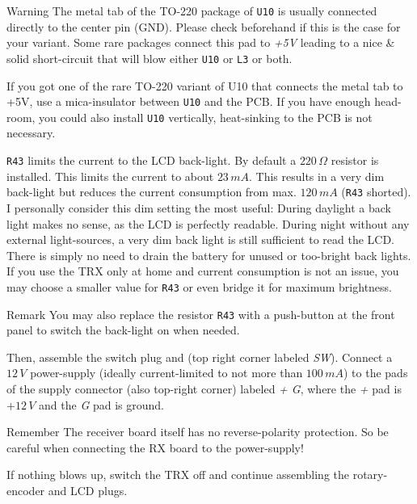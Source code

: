 \documentclass[10pt, a4paper,twoside]{scrartcl}
\newenvironment{remember}{\begin{bclogo}[couleur=blue!30,arrondi=.1,logo=\bccrayon,ombre=true]{Remember}}{\end{bclogo}}
\newenvironment{remark}{\begin{bclogo}[couleur=blue!30,arrondi=.1,logo=\bcinfo,ombre=true]{Remark}}{\end{bclogo}}
\newenvironment{warning}{\begin{bclogo}[couleur=red!30,arrondi=.1,logo=\bcattention,ombre=true]{Warning}}{\end{bclogo}}
\begin{document}
\begin{warning}
The metal tab of the TO-220 package of \texttt{U10} is usually connected directly to the center pin (GND). Please check beforehand if this is the case for your variant. Some rare packages connect this pad to \emph{+5V} leading to a nice \& solid short-circuit that will blow either \texttt{U10} or \texttt{L3} or both.
\end{warning}

If you got one of the rare TO-220 variant of U10 that connects the metal tab to +5V, use a mica-insulator between \texttt{U10} and the PCB. If you have enough head-room, you could also install \texttt{U10} vertically, heat-sinking to the PCB is not necessary.

 \texttt{R43} limits the current to the LCD back-light. By default a $220\,\Omega$ resistor is installed. This limits the current to about $23\,mA$. This results in a very dim back-light but reduces the current consumption from max. $120\, mA$ (\texttt{R43} shorted). I personally consider this dim setting the most useful: During daylight a back light makes no sense, as the LCD is perfectly readable. During night without any external light-sources, a very dim back light is still sufficient to read the LCD. There is simply no need to drain the battery for unused or too-bright back lights. If you use the TRX only at home and current consumption is not an issue, you may choose a smaller value for \texttt{R43} or even bridge it for maximum brightness.
 
\begin{remark} 
 You may also replace the resistor \texttt{R43} with a push-button at the front panel to switch the back-light on when needed.
\end{remark}
 
 Then, assemble the switch plug and (top right corner labeled \emph{SW}). Connect a $12\,V$ power-supply (ideally current-limited to not more than $100\,mA$) to the pads of the supply connector (also top-right corner) labeled \emph{+ G}, where the \emph{+} pad is $+12\,V$ and the \emph{G} pad is ground. 

\begin{remember}
 The receiver board itself has no reverse-polarity protection. So be careful when connecting the RX board to the power-supply!
\end{remember}
  
 If nothing blows up, switch the TRX off and continue assembling the rotary-encoder and LCD plugs. 
 
\end{document}
